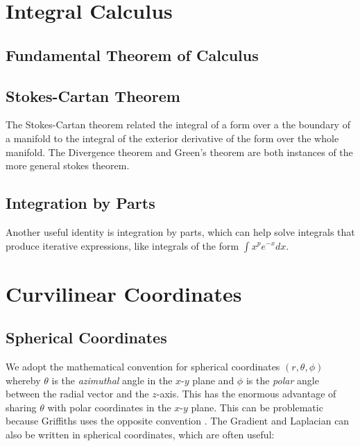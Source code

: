 \section{Integral Calculus}
\subsection{Fundamental Theorem of Calculus}

\subsection{Stokes-Cartan Theorem}
The Stokes-Cartan theorem related the integral of a form over a the boundary of a manifold to the integral of the exterior derivative of the form over the whole manifold. The Divergence theorem and Green's theorem are both instances of the more general stokes theorem.

\subsection{Integration by Parts}
Another useful identity is integration by parts, which can help solve integrals that produce iterative expressions, like integrals of the form $\int x^p e^{-x} dx$.

\section{Curvilinear Coordinates}
\subsection{Spherical Coordinates}
We adopt the mathematical convention for spherical coordinates $(r, \theta, \phi)$ whereby $\theta$ is the \textit{azimuthal} angle in the $x$-$y$ plane and $\phi$ is the \textit{polar} angle between the radial vector and the $z$-axis. This has the enormous advantage of sharing $\theta$ with polar coordinates in the $x$-$y$ plane. This can be problematic because Griffiths uses the opposite convention \cite{griffithsIntroductionElectrodynamics2018}.
The Gradient and Laplacian can also be written in spherical coordinates, which are often useful:


